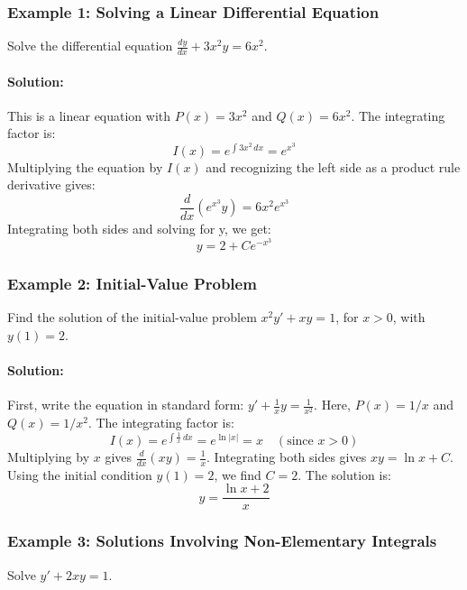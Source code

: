 \documentclass{article}
\begin{document}
\subsubsection*{Example 1: Solving a Linear Differential Equation}
Solve the differential equation $\frac{dy}{dx} + 3x^2 y = 6x^2$.

\paragraph{Solution:}
This is a linear equation with $P(x) = 3x^2$ and $Q(x) = 6x^2$. The integrating factor is:
\[I(x) = e^{\int 3x^2 \, dx} = e^{x^3}\]
Multiplying the equation by $I(x)$ and recognizing the left side as a product rule derivative gives:
\[\frac{d}{dx}(e^{x^3} y) = 6x^2 e^{x^3}\]
Integrating both sides and solving for y, we get:
\[y = 2 + Ce^{-x^3}\]


\subsubsection*{Example 2: Initial-Value Problem}
Find the solution of the initial-value problem $x^2 y' + xy = 1$, for $x>0$, with $y(1)=2$.

\paragraph{Solution:}
First, write the equation in standard form: $y' + \frac{1}{x}y = \frac{1}{x^2}$. Here, $P(x) = 1/x$ and $Q(x) = 1/x^2$. The integrating factor is:
\[I(x) = e^{\int \frac{1}{x} \, dx} = e^{\ln|x|} = x \quad (\text{since } x>0)\]
Multiplying by $x$ gives $\frac{d}{dx}(xy) = \frac{1}{x}$. Integrating both sides gives $xy = \ln x + C$.
Using the initial condition $y(1)=2$, we find $C=2$. The solution is:
\[y = \frac{\ln x + 2}{x}\]

\subsubsection*{Example 3: Solutions Involving Non-Elementary Integrals}
Solve $y' + 2xy = 1$.
\end{document}
